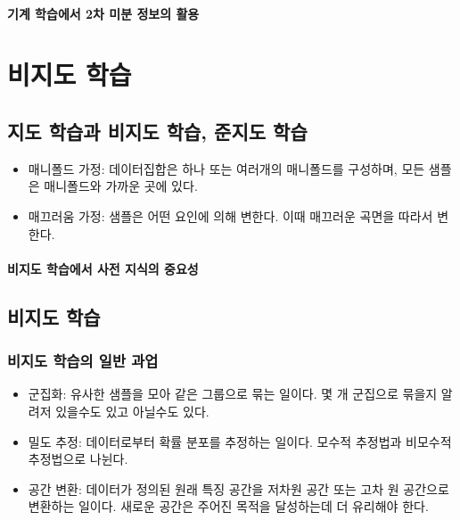 \documentclass [12pt] {oblivoir}
\let\oldsubsubsection=\subsubsection
\renewcommand{\subsubsection}
{
  \filbreak
  \oldsubsubsection
}
\begin{document}
\paragraph*{기계 학습에서 2차 미분 정보의 활용}\mbox{}

\vspace{3mm}

\newpage
\section{비지도 학습}

\subsection{지도 학습과 비지도 학습, 준지도 학습}

\begin{itemize}
  \item 매니폴드 가정: 데이터집합은 하나 또는 여러개의 매니폴드를 구성하며, 모든 샘플은 매니폴드와 가까운 곳에 있다.
  \item 매끄러움 가정: 샘플은 어떤 요인에 의해 변한다. 이때 매끄러운 곡면을 따라서 변한다.
\end{itemize}

\paragraph*{비지도 학습에서 사전 지식의 중요성}\mbox{}

\vspace{3mm}

\subsection{비지도 학습}

\subsubsection{비지도 학습의 일반 과업}

\begin{itemize}
  \item 군집화: 유사한 샘플을 모아 같은 그룹으로 묶는 일이다. 몇 개 군집으로 묶을지 알려저 있을수도 있고 아닐수도 있다.
  \item 밀도 추정: 데이터로부터 확률 분포를 추정하는 일이다. 모수적 추정법과 비모수적 추정법으로 나뉜다.
  \item 공간 변환: 데이터가 정의된 원래 특징 공간을 저차원 공간 또는 고차 원 공간으로 변환하는 일이다. 새로운 공간은 주어진 목적을 달성하는데 더 유리해야 한다.
\end{itemize}
\end{document}
